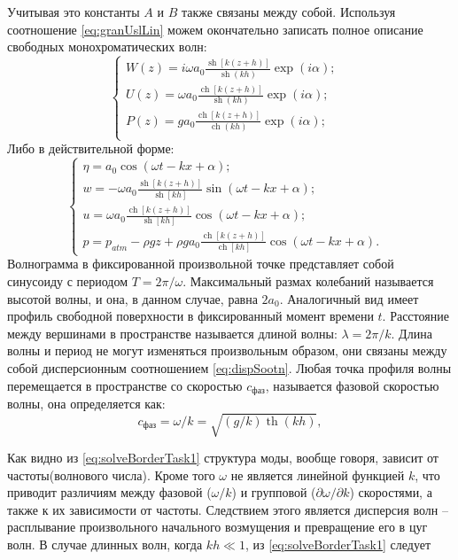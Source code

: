 Учитывая это константы $A$ и $B$ также связаны между собой. Используя соотношение \eqref{eq:granUslLin} можем окончательно записать полное описание свободных монохроматических волн:
\begin{equation}\label{eq:solveBorderTask1}
  \begin{cases}
  W(z)=i\omega a_0\frac{\operatorname{sh}[k(z+h)]}{\operatorname{sh}(kh)}\exp(i\alpha); & \\
  U(z)=\omega a_0\frac{\operatorname{ch}[k(z+h)]}{\operatorname{sh}(kh)}\exp(i\alpha); & \\
  P(z)=g a_0\frac{\operatorname{ch}[k(z+h)]}{\operatorname{ch}(kh)}\exp(i\alpha); & \\
  \end{cases}
\end{equation}
Либо в действительной форме:
\begin{equation}\label{eq:solveBorderTask1}
  \begin{cases}
  \eta=a_0\cos(\omega t-kx+\alpha); & \\
  w = -\omega a_0\frac{\operatorname{sh}[k(z+h)]}{\operatorname{sh}[kh]}\sin(\omega t - kx+\alpha); & \\
  u = \omega a_0\frac{\operatorname{ch}[k(z+h)]}{\operatorname{sh}[kh]}\cos(\omega t - kx+\alpha); & \\
  p = p_{atm}-\rho gz+\rho ga_0\frac{\operatorname{ch}[k(z+h)]}{\operatorname{ch}[kh]}\cos(\omega t - kx+\alpha). &
  \end{cases}
\end{equation}
Волнограмма в фиксированной произвольной точке представляет собой синусоиду с периодом $T=2\pi/\omega$. Максимальный размах колебаний называется высотой волны, и она, в данном случае, равна $2a_0$. Аналогичный вид имеет профиль свободной поверхности в фиксированный момент времени $t$. Расстояние между вершинами в пространстве называется длиной волны: $\lambda=2\pi/k$. Длина волны и период не могут изменяться произвольным образом, они связаны между собой дисперсионным соотношением \eqref{eq:dispSootn}. Любая точка профиля волны перемещается в пространстве со скоростью $c_{\text{фаз}}$, называется фазовой скоростью волны, она определяется как:
\begin{equation}\label{eq:fazSpeed}
  c_{\text{фаз}}=\omega/k=\sqrt{(g/k)\operatorname{th}(kh)},
\end{equation}

Как видно из \eqref{eq:solveBorderTask1} структура моды, вообще говоря, зависит от частоты(волнового числа).
Кроме того $\omega$ не является линейной функцией $k$, что приводит различиям между фазовой ($\omega/k$) и групповой ($\partial\omega/\partial k$) скоростями, а также к их зависимости от частоты. Следствием этого является дисперсия волн -- расплывание произвольного начального возмущения и превращение его в цуг волн. В случае длинных волн, когда $kh\ll1$, из \eqref{eq:solveBorderTask1} следует

